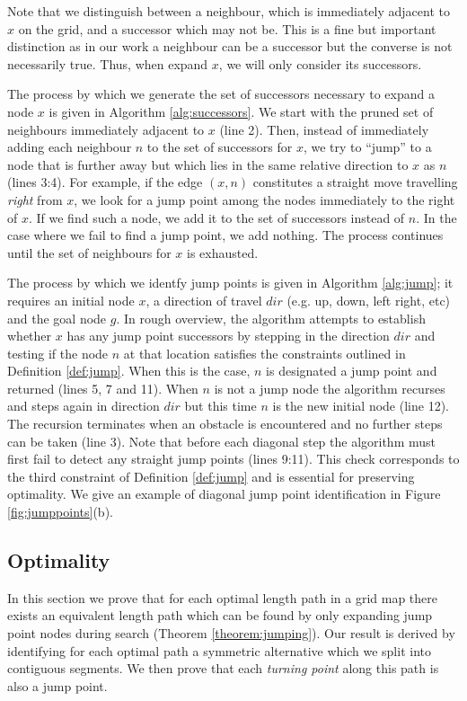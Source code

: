 Note that we distinguish between a neighbour, which is immediately adjacent to
$x$ on the grid, and a successor which may not be. 
This is a fine but important distinction as in our work a neighbour can be a 
successor but the converse is not necessarily true.
Thus, when expand $x$, we will only consider its successors.

The process by which we generate the set of successors necessary to expand a
node $x$ is given in Algorithm \ref{alg:successors}.
We start with the pruned set of neighbours immediately adjacent to $x$ (line 2).
Then, instead of immediately adding each neighbour $n$ to the set of successors
for $x$, we try to ``jump'' to a node that is further away but which lies in the 
same relative direction to $x$ as $n$ (lines 3:4). 
For example, if the edge $(x, n)$ constitutes a
straight move travelling \emph{right} from $x$, we look for a jump point among
the nodes immediately to the right of $x$.
If we find such a node, we add it to the set of successors instead of $n$.
In the case where we fail to find a jump point, we add nothing.
The process continues until the set of neighbours for $x$ is exhausted.



The process by which we identfy jump points is given in Algorithm
\ref{alg:jump}; it requires an initial node $x$, a direction of travel $dir$
(e.g. up, down, left right, etc) and the goal node $g$.
In rough overview, the algorithm attempts to establish whether $x$ has any 
jump point successors by stepping in the direction $dir$ and testing
if the node $n$ at that location satisfies the constraints outlined in 
Definition \ref{def:jump}.
When this is the case, $n$ is designated a jump point and returned (lines 5, 7
and 11).
When $n$ is not a jump node the algorithm recurses and steps again in direction
$dir$ but this time $n$ is the new initial node (line 12).
The recursion terminates when an obstacle is encountered and no further
steps can be taken (line 3).
Note that before each diagonal step the algorithm must first 
fail to detect any straight jump points (lines 9:11). 
This check corresponds to the third constraint of Definition \ref{def:jump} 
and is essential for preserving optimality.
We give an example of diagonal jump point identification in Figure
\ref{fig:jumppoints}(b).


\subsection{Optimality}
In this section we prove that for each optimal length path in a grid map there
exists an equivalent length path which can be found by only expanding jump
point nodes during search (Theorem \ref{theorem:jumping}).  Our result is
derived by identifying for each optimal path a symmetric alternative which we
split into contiguous segments. We then prove that each \emph{turning point}
along this path is also a jump point.

